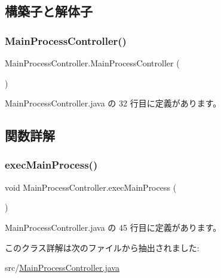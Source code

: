 \subsection{構築子と解体子}
\mbox{\label{class_main_process_controller_af422b069cc9f6cadb45a64ef985bd536}} 
\subsubsection{\texorpdfstring{MainProcessController()}{MainProcessController()}}
{\footnotesize\ttfamily Main\+Process\+Controller.\+Main\+Process\+Controller (\begin{DoxyParamCaption}{ }\end{DoxyParamCaption})\hspace{0.3cm}{\ttfamily [inline]}}



 Main\+Process\+Controller.\+java の 32 行目に定義があります。



\subsection{関数詳解}
\mbox{\label{class_main_process_controller_ac92bd6b23aa4c17913d6a9c63ee72739}} 
\subsubsection{\texorpdfstring{execMainProcess()}{execMainProcess()}}
{\footnotesize\ttfamily void Main\+Process\+Controller.\+exec\+Main\+Process (\begin{DoxyParamCaption}{ }\end{DoxyParamCaption})\hspace{0.3cm}{\ttfamily [inline]}}



 Main\+Process\+Controller.\+java の 45 行目に定義があります。



このクラス詳解は次のファイルから抽出されました\+:\begin{DoxyCompactItemize}
\item 
src/\mbox{\hyperlink{_main_process_controller_8java}{Main\+Process\+Controller.\+java}}\end{DoxyCompactItemize}
